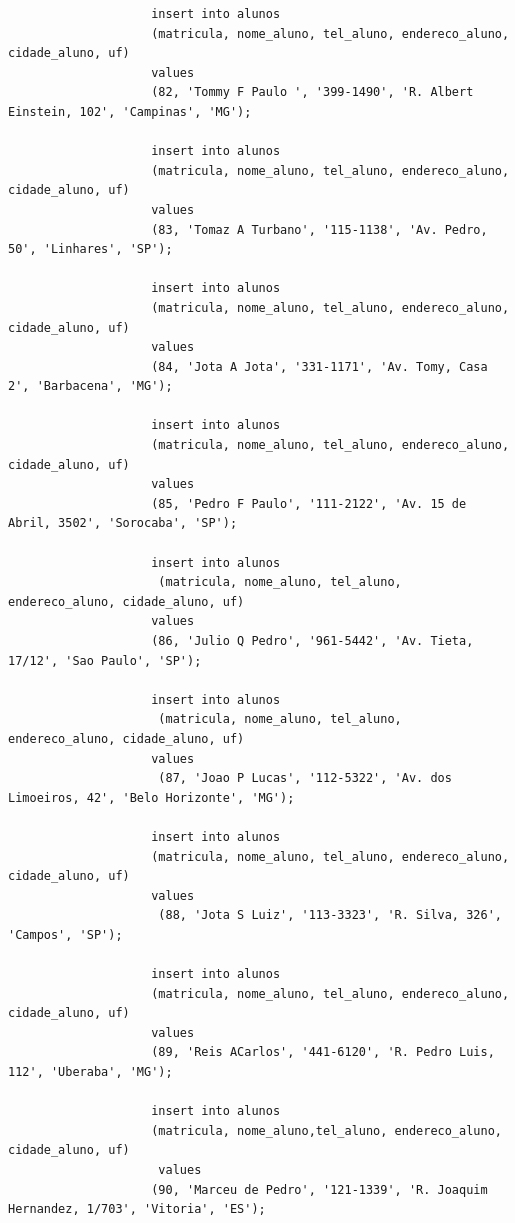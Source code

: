 \documentclass[
article,			%
11pt,				%
oneside,			%
a4paper,			%
english,			%
brazil,				%
sumario=tradicional
]{abntex2}
\begin{document}
\begin{enumerate}
\begin{verbatim}
					insert into alunos 
					(matricula, nome_aluno, tel_aluno, endereco_aluno, cidade_aluno, uf)
					values
					(82, 'Tommy F Paulo ', '399-1490', 'R. Albert Einstein, 102', 'Campinas', 'MG');
					
					insert into alunos 
					(matricula, nome_aluno, tel_aluno, endereco_aluno, cidade_aluno, uf)
					values
					(83, 'Tomaz A Turbano', '115-1138', 'Av. Pedro, 50', 'Linhares', 'SP');
					
					insert into alunos 
					(matricula, nome_aluno, tel_aluno, endereco_aluno, cidade_aluno, uf)
					values 
					(84, 'Jota A Jota', '331-1171', 'Av. Tomy, Casa 2', 'Barbacena', 'MG');
					
					insert into alunos
					(matricula, nome_aluno, tel_aluno, endereco_aluno, cidade_aluno, uf)
					values 
					(85, 'Pedro F Paulo', '111-2122', 'Av. 15 de Abril, 3502', 'Sorocaba', 'SP');
					
					insert into alunos
					 (matricula, nome_aluno, tel_aluno, endereco_aluno, cidade_aluno, uf)
					values 
					(86, 'Julio Q Pedro', '961-5442', 'Av. Tieta, 17/12', 'Sao Paulo', 'SP');
					
					insert into alunos
					 (matricula, nome_aluno, tel_aluno, endereco_aluno, cidade_aluno, uf)
					values
					 (87, 'Joao P Lucas', '112-5322', 'Av. dos Limoeiros, 42', 'Belo Horizonte', 'MG');
					
					insert into alunos 
					(matricula, nome_aluno, tel_aluno, endereco_aluno, cidade_aluno, uf)
					values
					 (88, 'Jota S Luiz', '113-3323', 'R. Silva, 326', 'Campos', 'SP');
					
					insert into alunos
					(matricula, nome_aluno, tel_aluno, endereco_aluno, cidade_aluno, uf)
					values 
					(89, 'Reis ACarlos', '441-6120', 'R. Pedro Luis, 112', 'Uberaba', 'MG');
					
					insert into alunos 
					(matricula, nome_aluno,tel_aluno, endereco_aluno, cidade_aluno, uf)
					 values 
					(90, 'Marceu de Pedro', '121-1339', 'R. Joaquim Hernandez, 1/703', 'Vitoria', 'ES');
					

\end{verbatim}
\end{enumerate}
\end{document}
